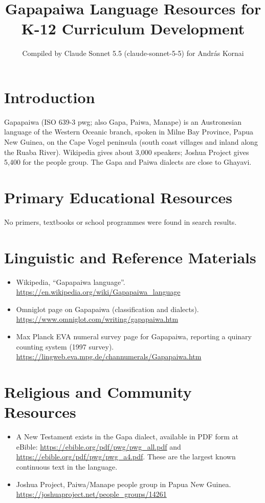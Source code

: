 \documentclass[12pt]{article}
\title{Gapapaiwa Language Resources for K-12 Curriculum Development}
\author{Compiled by Claude Sonnet 5.5 (claude-sonnet-5-5) for Andr\'as Kornai}
\date{}
\begin{document}
\maketitle

\section{Introduction}
Gapapaiwa (ISO 639-3 pwg; also Gapa, Paiwa, Manape) is an Austronesian language of the Western Oceanic branch, spoken in Milne Bay Province, Papua New Guinea, on the Cape Vogel peninsula (south coast villages and inland along the Ruaba River). Wikipedia gives about 3,000 speakers; Joshua Project gives 5,400 for the people group. The Gapa and Paiwa dialects are close to Ghayavi.

\section{Primary Educational Resources}
No primers, textbooks or school programmes were found in search results.

\section{Linguistic and Reference Materials}
\begin{itemize}
\item Wikipedia, ``Gapapaiwa language''. \url{https://en.wikipedia.org/wiki/Gapapaiwa_language}
\item Omniglot page on Gapapaiwa (classification and dialects). \url{https://www.omniglot.com/writing/gapapaiwa.htm}
\item Max Planck EVA numeral survey page for Gapapaiwa, reporting a quinary counting system (1997 survey). \url{https://lingweb.eva.mpg.de/channumerals/Gapapaiwa.htm}
\end{itemize}

\section{Religious and Community Resources}
\begin{itemize}
\item A New Testament exists in the Gapa dialect, available in PDF form at eBible: \url{https://ebible.org/pdf/pwg/pwg_all.pdf} and \url{https://ebible.org/pdf/pwg/pwg_a4.pdf}. These are the largest known continuous text in the language.
\item Joshua Project, Paiwa/Manape people group in Papua New Guinea. \url{https://joshuaproject.net/people_groups/14261}
\end{itemize}
\end{document}
